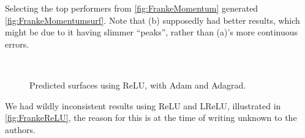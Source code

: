 \documentclass{article}
\theoremstyle{definition}
\begin{document}
Selecting the top performers from \autoref{fig:FrankeMomentum} generated \autoref{fig:FrankeMomentumsurf}. Note that (b) supposedly had better results, which might be due to it having slimmer ``peaks'', rather than (a)'s more continuous errors.

\begin{figure}[H]%
    \centering
    \\
    \caption{Predicted surfaces using ReLU, with Adam and Adagrad.}%
    \label{fig:FrankeReLU}%
\end{figure}

We had wildly inconsistent results using ReLU and LReLU, illustrated in \autoref{fig:FrankeReLU}, the reason for this is at the time of writing unknown to the authors.
\end{document}
